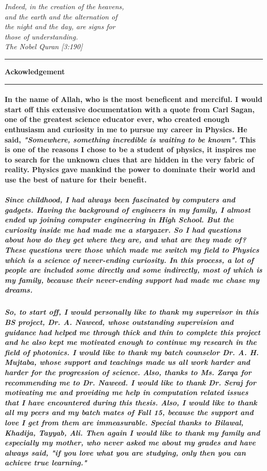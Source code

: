 \documentclass[12pt,twoside]{report}
\begin{document}

\newpage
\pagestyle{empty}
\begin{flushright}
\textit{\small{Indeed, in the creation of the heavens,\\ and the earth and the alternation of\\ the night and the day, are signs for\\ those of understanding.\\ The Nobel Quran [3:190]}}
\end{flushright}
\noindent\rule{15cm}{1pt}
\begin{flushleft}
\textbf{\Large{Ackowledgement}}
\end{flushleft}
\noindent\rule{15cm}{1pt} 
\paragraph{ \normalfont In the name of Allah, who is the most beneficent and merciful. I would start off this extensive documentation with a quote from Carl Sagan, one of the greatest science educator ever, who created enough enthusiasm and curiosity in me to pursue my career in Physics. He said, \textit{"Somewhere, something incredible is waiting to be known".} This is one of the reasons I chose to be a student of physics, it inspires me to search for the unknown clues that are hidden in the very fabric of reality. Physics gave mankind the power to dominate their world and use the best of nature for their benefit.}
\subparagraph{ \normalfont Since childhood, I had always been fascinated by computers and gadgets. Having the background of engineers in my family, I almost ended up joining computer engineering in High School. But the curiosity inside me had made me a stargazer. So I had questions about how do they get where they are, and what are they made of? These questions were those which made me switch my field to Physics which is a science of never-ending curiosity. In this process, a lot of people are included some directly and some indirectly, most of which is my family, because their never-ending support had made me chase my dreams.}
\subparagraph{ \normalfont So, to start off, I would personally like to thank my supervisor in this BS project, Dr. A. Naweed, whose outstanding supervision and guidance had helped me through thick and thin to complete this project and he also kept me motivated enough to continue my research in the field of photonics. I would like to thank my batch counselor Dr. A. H. Mujtaba, whose support and teachings made us all work harder and harder for the progression of science. Also, thanks to Ms. Zarqa for recommending me to Dr. Naweed. I would like to thank Dr. Seraj for motivating me and providing me help in computation related issues that I have encountered during this thesis. Also, I would like to thank all my peers and my batch mates of Fall 15, because the support and love I get from them are immeasurable. Special thanks to Bilawal, Khadija, Tayyab, Ali. Then again I would like to thank my family and especially my mother, who never asked me about my grades and have always said, "if you love what you are studying, only then you can achieve true learning."}
\end{document}
